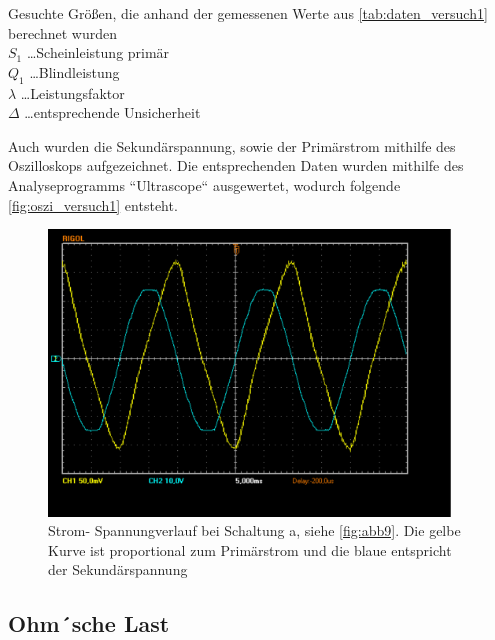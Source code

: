 \documentclass[11pt,ngerman]{scrartcl}
\begin{document}
\begin{table}[H]
	\caption{Gesuchte Größen, die anhand der gemessenen Werte aus
		\autoref{tab:daten_versuch1} berechnet wurden \\
		$S_1$ \dots Scheinleistung primär \\
		$Q_1$ \dots  Blindleistung\\
		$\lambda$ \dots Leistungsfaktor \\
		$\Delta$ \dots entsprechende Unsicherheit
	}
	\label{tab:ergebnisse_versuch1}
	\begin{center}
		
	\end{center}
\end{table}

Auch wurden die Sekundärspannung, sowie der Primärstrom mithilfe des
Oszilloskops aufgezeichnet. Die entsprechenden Daten wurden mithilfe des
Analyseprogramms ``Ultrascope`` ausgewertet, wodurch folgende
\autoref{fig:oszi_versuch1} entsteht.


\begin{figure}[H]
	\begin{center}
		\includegraphics[width=0.95\textwidth]{./trafo/leerlauf.pdf}
	\end{center}
	\caption{Strom- Spannungverlauf bei Schaltung a, siehe \autoref{fig:abb9}.
		Die gelbe Kurve ist proportional zum Primärstrom und die blaue entspricht der Sekundärspannung}
	\label{fig:oszi_versuch1}
\end{figure}


\subsection{Ohm´sche Last}
\end{document}
